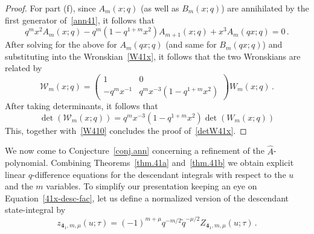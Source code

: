 \documentclass[12pt,reqno]{amsart}
\theoremstyle{definition}
\def\calW{\mathcal W}
\def\tq{\tilde{q}}
\def\Ahat{\widehat{A}}
\def\md{\mathbf}
\newcommand{\knot}[1]{\md{#1}}
\begin{document}
\begin{proof}
  For part (f), since $A_m(x;q)$ (as well as $B_m(x;q)$) are
  annihilated by the first generator of~\eqref{ann41}, it follows that
  \begin{equation}
    q^m x^2 A_m(x;q) -q^m (1 - q^{1 + m} x^2) A_{m+1}(x;q)
    + x^3 A_m(qx;q) =0 \,.
  \end{equation}
  After solving for the above for $A_m(qx;q)$ (and same for
  $B_m(qx;q)$) and substituting into the Wronskian~\eqref{W41x}, it
  follows that the two Wronskians are related by
  \begin{equation}
    \label{W41xm}
    \calW_m(x;q) =
    \begin{pmatrix} 1 & 0 \\ -q^m x^{-1} & q^m x^{-3}(1-q^{1+m} x^2)
    \end{pmatrix}
    W_m(x;q) \,.
  \end{equation}
  After taking determinants, it follows that
  \begin{equation}
    \det(\calW_m(x;q)) = q^m x^{-3} (1 - q^{1 + m} x^2)\det(W_m(x;q))
    \label{detW41xm}
  \end{equation}
  This, together with~\eqref{W410} concludes the proof of~\eqref{detW41x}.
\end{proof}

We now come to Conjecture~\ref{conj.ann} concerning a refinement of
the $\Ahat$-polynomial.  
Combining Theorems~\ref{thm.41a} and~\ref{thm.41b} we obtain explicit
linear $q$-difference equations for the descendant integrals with respect
to the $u$ and the $m$ variables. To simplify our presentation
keeping an eye on Equation~\eqref{41x-desc-fac}, let us define
a normalized version of the descendant state-integral by
\begin{equation}
  \label{Z41r}
  z_{\knot{4}_1,m,\mu}(u;\tau) =
  (-1)^{m+\mu}q^{-m/2}\tq^{-\mu/2}
  Z_{\knot{4}_1,m,\mu}(u;\tau) \,.
\end{equation}
\end{document}
